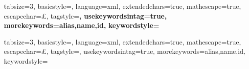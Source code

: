 {
  tabsize=3,
  basicstyle=\small\upshape\ttfamily,
  language=xml,
  extendedchars=true,
  mathescape=true,
  escapechar=£,
  tagstyle=\bfseries,
  usekeywordsintag=true,
  morekeywords={alias,name,id},
  keywordstyle=\color{lstred}
}


{
  tabsize=3,
  basicstyle=\small\upshape\ttfamily,
  language=xml,
  extendedchars=true,
  mathescape=true,
  escapechar=£,
  tagstyle=\color{keywordpurple},
  usekeywordsintag=true,
  morekeywords={alias,name,id},
  keywordstyle=\color{lstred}
}
